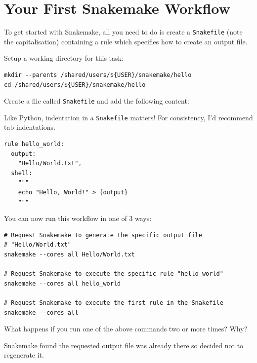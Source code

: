 \section{Your First Snakemake Workflow}

To get started with Snakemake, all you need to do is create a \texttt{Snakefile} (note the capitalisation) containing a rule which specifies how to create an output file.

Setup a working directory for this task:

\begin{lstlisting}
mkdir --parents /shared/users/${USER}/snakemake/hello
cd /shared/users/${USER}/snakemake/hello
\end{lstlisting}

Create a file called \texttt{Snakefile} and add the following content:

\begin{warning}

Like Python, indentation in a \texttt{Snakefile} matters! For consistency, I'd recommend tab indentations.

\end{warning}

\begin{lstlisting}
rule hello_world:
  output:
    "Hello/World.txt",
  shell:
    """
    echo "Hello, World!" > {output}
    """
\end{lstlisting}

You can now run this workflow in one of 3 ways:

\begin{lstlisting}
# Request Snakemake to generate the specific output file
# "Hello/World.txt"
snakemake --cores all Hello/World.txt

# Request Snakemake to execute the specific rule "hello_world"
snakemake --cores all hello_world

# Request Snakemake to execute the first rule in the Snakefile
snakemake --cores all
\end{lstlisting}

\begin{questions}

What happens if you run one of the above commands two or more times? Why?

\begin{answer}
Snakemake found the requested output file was already there so decided not to regenerate it.
\end{answer}

\end{questions}



